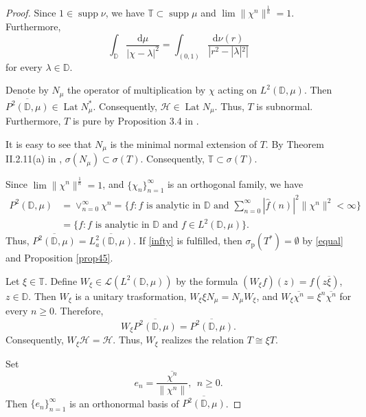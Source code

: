 \documentclass[a4paper,oneside,11pt]{amsart}
\numberwithin{equation}{section}
\theoremstyle{plain}
\theoremstyle{definition}
\begin{document}
\begin{proof}  Since $1\in\operatorname{supp}\nu$, we have  $\mathbb T\subset\operatorname{supp}\mu$   
and $\lim\|\chi^n\|^{\frac{1}{n}}=1$. Furthermore, 
\begin{equation}\label{equal}\int_{\mathbb D}\frac{\mathrm{d}\mu}{|\chi-\lambda|^2} = 
\int_{(0,1)}\frac{\mathrm{d}\nu(r)}{|r^2-|\lambda|^2|} 
\end{equation}
for every $\lambda\in\mathbb D$.

Denote by $N_\mu$ the operator of multiplication by $\chi$ acting on $L^2(\mathbb D,\mu)$. 
Then  $\overline{P^2(\mathbb D,\mu)}\in\operatorname{Lat}N_\mu^*$. Consequently, 
$\mathcal H\in\operatorname{Lat}N_\mu$. Thus, $T$ is subnormal. Furthermore, $T$ is pure by Proposition 3.4 in \cite{feldman}. 

It is easy to see that $N_\mu$ is the minimal normal extension of $T$. By Theorem II.2.11(a) in \cite{conwaysubnormal}, 
 $\sigma(N_\mu)\subset\sigma(T)$.
Consequently,  $\mathbb T\subset\sigma(T)$. 
  
 Since $\lim\|\chi^n\|^{\frac{1}{n}}=1$, and    $\{\chi_n\}_{n=1}^\infty$ is an orthogonal family,  we have 
 \begin{align*} P^2(\mathbb D,\mu)&=\vee_{n=0}^\infty\chi^n=
\{f \colon f \text{ is analytic in } \mathbb D \text{ and } 
\sum_{n=0}^\infty|\widehat f(n)|^2\|\chi^n\|^2<\infty\}\\&=
\{f \colon f \text{ is analytic in } \mathbb D \text{ and }   f\in L^2(\mathbb D,\mu)\}. 
\end{align*}
Thus, $\overline{P^2(\mathbb D,\mu)}=\overline{L^2_a(\mathbb D,\mu)}$. 
If \eqref{infty} is fulfilled, then  
 $\sigma_{\mathrm{p}}(T^*)=\emptyset$ by \eqref{equal} and  Proposition \ref{prop45}.  

Let $\xi\in\mathbb T$. Define $W_\xi\in\mathcal L(L^2(\mathbb D,\mu))$ by the formula $(W_\xi f)(z)=f(z\overline\xi)$, 
$z\in\mathbb D$.  
Then $W_\xi$ is a unitary trasformation, $W_\xi \xi N_\mu= N_\mu W_\xi$, and 
$W_\xi\overline{\chi^n}=\xi^n\overline{\chi^n}$ for every $n\geq 0$. Therefore, 
\begin{equation*} W_\xi \overline{P^2(\mathbb D,\mu)}= \overline{P^2(\mathbb D,\mu)}.
\end{equation*}
Consequently, $W_\xi\mathcal H=\mathcal H$. Thus, $W_\xi$ realizes the relation $T\cong\xi T$. 

Set \begin{equation*} 
 e_n=\frac{\overline{\chi^n}}{\|\chi^n\|}, \ \ n\geq 0. 
\end{equation*}
Then   $\{e_n\}_{n=1}^\infty$ is an orthonormal basis of $ \overline{P^2(\mathbb D,\mu)}$. 


\end{proof}
\end{document}
